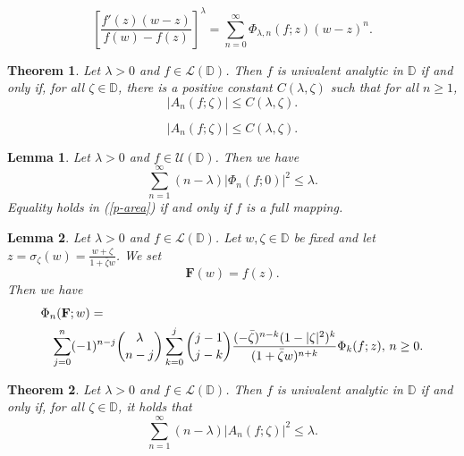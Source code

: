 \documentclass[10pt,a4paper]{amsart}
\newtheorem{theorem}{Theorem}
\newtheorem{lemma}{Lemma}
\begin{document}
\begin{equation}\label{new}
\left[\frac{f'(z)(w-z)}{f(w)-f(z)}\right]^{\lambda}=\sum_{n=0}^{\infty}\Phi_{\lambda, n}(f; z)(w-z)^n.
\end{equation}

\begin{theorem}\label{main-3}
Let $\lambda>0$ and $f \in \mathcal{L}(\mathbb{D})$. Then $f$ is univalent analytic in $\mathbb{D}$ if and only if, for all $\zeta\in \mathbb{D}$, there is a positive constant $C(\lambda, \zeta)$ such that for all $n\geq 1$,
\begin{equation}\label{m-ine-3}\left|A_n(f; \zeta)\right|\leq C(\lambda, \zeta).
\end{equation}
\end{theorem}

\begin{equation}\left|A_n(f; \zeta)\right|\leq C(\lambda, \zeta).
\end{equation}

\begin{lemma}\label{lemma-1}
Let  $\lambda>0$ and $f\in \mathcal{U}(\mathbb{D})$. Then we have
 \begin{equation}\label{p-area}
 \sum_{n=1}^{\infty}(n-\lambda)|\Phi_n(f; 0)|^2\leq \lambda.
 \end{equation}
 Equality holds in (\ref{p-area}) if and only if $f$ is a full mapping.
\end{lemma}

\begin{lemma}\label{lemma-2}
Let $\lambda>0$ and $f\in \mathcal{L}(\mathbb{D})$. Let $w, \zeta\in \mathbb{D}$ be fixed and let $z=\sigma_{\zeta}(w)=\frac{w+\zeta}{1+\bar{\zeta}w}$.  We set
$$\mathbf{F}(w)=f(z).$$
Then we have 
\begin{eqnarray}\label{l-22}
\lefteqn{\Phi_{n}(\mathbf{F}; w)=} \nonumber\\
&&\sum_{j=0}^{n}(-1)^{n-j}\binom{\lambda}{n-j}\sum_{k=0}^{j}\binom{j-1}{j-k}\frac{(-\bar{\zeta})^{n-k}(1-|\zeta|^2)^{k}}{(1+\bar{\zeta}w)^{n+k}}\Phi_{k}(f; z), \, n\geq 0.
\end{eqnarray}
\end{lemma} 

\begin{theorem}\label{main-1}
Let $\lambda>0$ and $f \in \mathcal{L}(\mathbb{D})$. Then $f$ is univalent analytic in $\mathbb{D}$ if and only if, for all $\zeta\in \mathbb{D}$, it holds that
\begin{equation}\label{m-ine-1}
\sum_{n=1}^{\infty}(n-\lambda)\left|A_n(f; \zeta)\right|^2\leq \lambda.
\end{equation}
\end{theorem}
\end{document}
